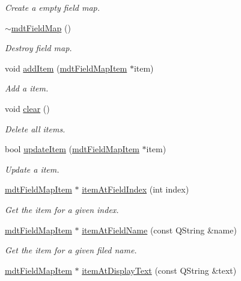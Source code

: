 \begin{DoxyCompactItemize}
\begin{DoxyCompactList}\small\item\em Create a empty field map. \end{DoxyCompactList}\item 
\hyperlink{classmdt_field_map_acb3e39f5f9cbc6047871000ae561a35e}{$\sim$mdtFieldMap} ()
\begin{DoxyCompactList}\small\item\em Destroy field map. \end{DoxyCompactList}\item 
void \hyperlink{classmdt_field_map_a6914818142ea30f7bce6a012be9fb69f}{addItem} (\hyperlink{classmdt_field_map_item}{mdtFieldMapItem} $\ast$item)
\begin{DoxyCompactList}\small\item\em Add a item. \end{DoxyCompactList}\item 
void \hyperlink{classmdt_field_map_ac7b6c8d9467614a9b9f72c5a504f74fe}{clear} ()
\begin{DoxyCompactList}\small\item\em Delete all items. \end{DoxyCompactList}\item 
bool \hyperlink{classmdt_field_map_aa0584d8f48751fe0b330b0c019a1ffe2}{updateItem} (\hyperlink{classmdt_field_map_item}{mdtFieldMapItem} $\ast$item)
\begin{DoxyCompactList}\small\item\em Update a item. \end{DoxyCompactList}\item 
\hyperlink{classmdt_field_map_item}{mdtFieldMapItem} $\ast$ \hyperlink{classmdt_field_map_aea299348705593f64bb15c3432b6cbf6}{itemAtFieldIndex} (int index)
\begin{DoxyCompactList}\small\item\em Get the item for a given index. \end{DoxyCompactList}\item 
\hyperlink{classmdt_field_map_item}{mdtFieldMapItem} $\ast$ \hyperlink{classmdt_field_map_ac13b4067aa6ac4d796bd8fd38a0d6572}{itemAtFieldName} (const QString \&name)
\begin{DoxyCompactList}\small\item\em Get the item for a given filed name. \end{DoxyCompactList}\item 
\hyperlink{classmdt_field_map_item}{mdtFieldMapItem} $\ast$ \hyperlink{classmdt_field_map_af1c0de37b2f02224eb4ff7f9af8caef5}{itemAtDisplayText} (const QString \&text)

\end{DoxyCompactItemize}
